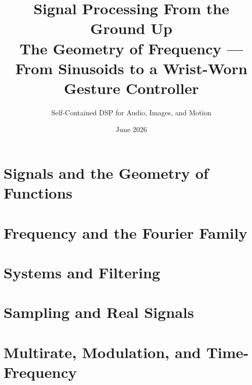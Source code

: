 \documentclass[11pt]{book}
\title{\textbf{Signal Processing From the Ground Up}\\[0.4em]\large The Geometry of Frequency --- From Sinusoids to a Wrist-Worn Gesture Controller}
\author{Self-Contained DSP for Audio, Images, and Motion}
\date{June 2026}
\begin{document}
\frontmatter
\maketitle

\tableofcontents

\mainmatter

\part{Signals and the Geometry of Functions}





\part{Frequency and the Fourier Family}








\part{Systems and Filtering}







\part{Sampling and Real Signals}





\part{Multirate, Modulation, and Time-Frequency}




\end{document}
